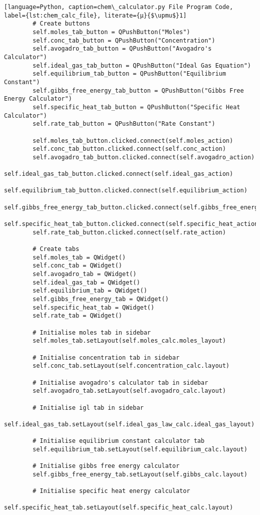\begin{lstlisting}[language=Python, caption=chem\_calculator.py File Program Code, label={lst:chem_calc_file}, literate={μ}{$\upmu$}1]
        # Create buttons
        self.moles_tab_button = QPushButton("Moles")
        self.conc_tab_button = QPushButton("Concentration")
        self.avogadro_tab_button = QPushButton("Avogadro's Calculator")
        self.ideal_gas_tab_button = QPushButton("Ideal Gas Equation")
        self.equilibrium_tab_button = QPushButton("Equilibrium Constant")
        self.gibbs_free_energy_tab_button = QPushButton("Gibbs Free Energy Calculator")
        self.specific_heat_tab_button = QPushButton("Specific Heat Calculator")
        self.rate_tab_button = QPushButton("Rate Constant")

        self.moles_tab_button.clicked.connect(self.moles_action)
        self.conc_tab_button.clicked.connect(self.conc_action)
        self.avogadro_tab_button.clicked.connect(self.avogadro_action)
        self.ideal_gas_tab_button.clicked.connect(self.ideal_gas_action)
        self.equilibrium_tab_button.clicked.connect(self.equilibrium_action)
        self.gibbs_free_energy_tab_button.clicked.connect(self.gibbs_free_energy_action)
        self.specific_heat_tab_button.clicked.connect(self.specific_heat_action)
        self.rate_tab_button.clicked.connect(self.rate_action)

        # Create tabs
        self.moles_tab = QWidget()
        self.conc_tab = QWidget()
        self.avogadro_tab = QWidget()
        self.ideal_gas_tab = QWidget()
        self.equilibrium_tab = QWidget()
        self.gibbs_free_energy_tab = QWidget()
        self.specific_heat_tab = QWidget()
        self.rate_tab = QWidget()

        # Initialise moles tab in sidebar
        self.moles_tab.setLayout(self.moles_calc.moles_layout)

        # Initialise concentration tab in sidebar
        self.conc_tab.setLayout(self.concentration_calc.layout)

        # Initialise avogadro's calculator tab in sidebar
        self.avogadro_tab.setLayout(self.avogadro_calc.layout)

        # Initialise igl tab in sidebar
        self.ideal_gas_tab.setLayout(self.ideal_gas_law_calc.ideal_gas_layout)

        # Initialise equilibrium constant calculator tab
        self.equilibrium_tab.setLayout(self.equilibrium_calc.layout)

        # Initialise gibbs free energy calculator
        self.gibbs_free_energy_tab.setLayout(self.gibbs_calc.layout)

        # Initialise specific heat energy calculator
        self.specific_heat_tab.setLayout(self.specific_heat_calc.layout)


\end{lstlisting}
